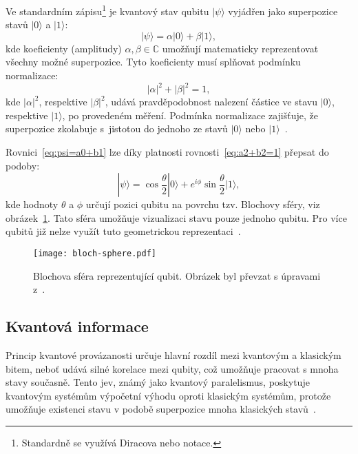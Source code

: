 Ve standardním zápisu\footnote{Standardně se využívá Diracova nebo  notace.} je kvantový stav qubitu $| \psi \rangle$ vyjádřen jako superpozice stavů $| 0 \rangle$ a $| 1 \rangle$:
\begin{equation}\label{eq:psi=a0+b1}
    | \psi \rangle = \alpha | 0 \rangle + \beta | 1 \rangle, 
\end{equation}
kde koeficienty (amplitudy) $\alpha, \beta \in \mathbb{C}$ umožňují matematicky reprezentovat všechny možné superpozice. 
Tyto koeficienty musí splňovat podmínku normalizace:
\begin{equation}\label{eq:a2+b2=1}
    \left| \alpha \right|^2 + \left| \beta \right|^2 = 1,   
\end{equation}
kde $\left| \alpha \right|^2$, respektive $\left| \beta \right|^2$, udává pravděpodobnost nalezení částice ve stavu $| 0 \rangle$, respektive $| 1 \rangle$, po provedeném měření. 
Podmínka normalizace zajišťuje, že superpozice zkolabuje s~jistotou do jednoho ze stavů $| 0 \rangle$ nebo $| 1 \rangle$~\cite{NaturalComputing,QuantumComputing-Curious}.

Rovnici~\ref{eq:psi=a0+b1} lze díky platnosti rovnosti~\ref{eq:a2+b2=1} přepsat do podoby:
\begin{equation*}
    | \psi \rangle = \cos{\frac{\theta}{2}} | 0 \rangle +  e^{i\phi} \sin{\frac{\theta}{2}} | 1 \rangle,
\end{equation*}
kde hodnoty $\theta$ a $\phi$ určují pozici qubitu na povrchu tzv. Blochovy sféry, viz obrázek~\ref{fig:bloch-sphere}. 
Tato sféra umožňuje vizualizaci stavu pouze jednoho qubitu. 
Pro více qubitů již nelze využít tuto geometrickou reprezentaci~\cite{QuantumComputing-Curious,QuantumComputing-QuantumInformation}. 

\begin{figure}[ht!]
    \centering
    \texttt{[image: bloch-sphere.pdf]}
    \caption{Blochova sféra reprezentující qubit. Obrázek byl převzat s úpravami z~\cite{QuantumComputing-QuantumInformation}.}
    \label{fig:bloch-sphere}
\end{figure}

\subsection{Kvantová informace}
Princip kvantové provázanosti určuje hlavní rozdíl mezi kvantovým a klasickým bitem, neboť udává silné korelace mezi qubity, což umožňuje pracovat s mnoha stavy současně. 
Tento jev, známý jako kvantový paralelismus, poskytuje kvantovým systémům výpočetní výhodu oproti klasickým systémům, protože umožňuje existenci stavu v podobě superpozice mnoha klasických stavů~\cite{NaturalComputing}.

